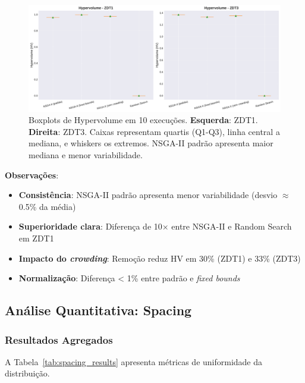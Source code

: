 \begin{figure}[H]
    \centering
    \includegraphics[width=\textwidth]{../plots/C_hypervolume_boxplots.pdf}
    \caption{Boxplots de Hypervolume em 10 execuções. \textbf{Esquerda}: ZDT1. \textbf{Direita}: ZDT3. Caixas representam quartis (Q1-Q3), linha central a mediana, e whiskers os extremos. NSGA-II padrão apresenta maior mediana e menor variabilidade.}
    \label{fig:hv_boxplots}
\end{figure}

\textbf{Observações}:
\begin{itemize}
    \item \textbf{Consistência}: NSGA-II padrão apresenta menor variabilidade (desvio $\approx$ 0.5\% da média)
    \item \textbf{Superioridade clara}: Diferença de 10× entre NSGA-II e Random Search em ZDT1
    \item \textbf{Impacto do \textit{crowding}}: Remoção reduz HV em 30\% (ZDT1) e 33\% (ZDT3)
    \item \textbf{Normalização}: Diferença < 1\% entre padrão e \textit{fixed bounds}
\end{itemize}

\subsection{Análise Quantitativa: Spacing}

\subsubsection{Resultados Agregados}

A Tabela~\ref{tab:spacing_results} apresenta métricas de uniformidade da distribuição.

